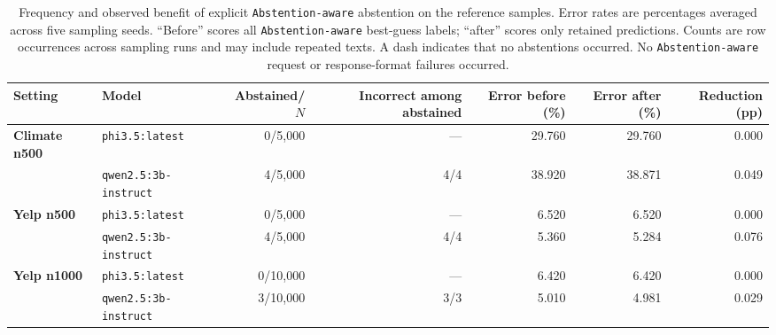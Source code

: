 \begin{table}[t]
\centering
\footnotesize
\caption{Frequency and observed benefit of explicit \texttt{Abstention-aware} abstention on the reference samples. Error rates are percentages averaged across five sampling seeds. ``Before'' scores all \texttt{Abstention-aware} best-guess labels; ``after'' scores only retained predictions. Counts are row occurrences across sampling runs and may include repeated texts. A dash indicates that no abstentions occurred. No \texttt{Abstention-aware} request or response-format failures occurred.}
\label{tab:rq3-abstention}
\setlength{\tabcolsep}{5pt}
\begin{tabular}{llrrrrr}
\toprule
\textbf{Setting} & \textbf{Model} & \textbf{Abstained/$N$} & \textbf{Incorrect among abstained} & \textbf{Error before (\%)} & \textbf{Error after (\%)} & \textbf{Reduction (pp)} \\
\midrule
\textbf{Climate n500} & \texttt{phi3.5:latest} & 0/5,000 & --- & 29.760 & 29.760 & 0.000 \\
 & \texttt{qwen2.5:3b-instruct} & 4/5,000 & 4/4 & 38.920 & 38.871 & 0.049 \\
\midrule
\textbf{Yelp n500} & \texttt{phi3.5:latest} & 0/5,000 & --- & 6.520 & 6.520 & 0.000 \\
 & \texttt{qwen2.5:3b-instruct} & 4/5,000 & 4/4 & 5.360 & 5.284 & 0.076 \\
\midrule
\textbf{Yelp n1000} & \texttt{phi3.5:latest} & 0/10,000 & --- & 6.420 & 6.420 & 0.000 \\
 & \texttt{qwen2.5:3b-instruct} & 3/10,000 & 3/3 & 5.010 & 4.981 & 0.029 \\
\bottomrule
\end{tabular}
\end{table}
